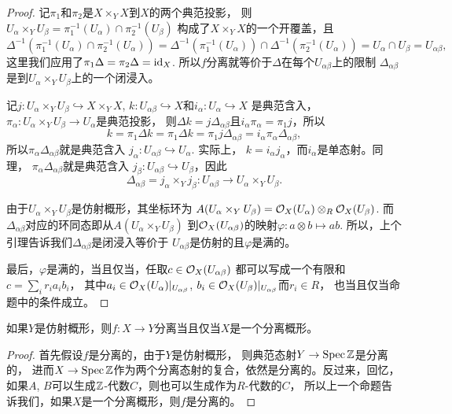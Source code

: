 \begin{proof}
记$\pi_1$和$\pi_2$是$X\times_Y X$到$X$的两个典范投影，
则$U_\alpha\times_Y U_\beta=\pi_1^{-1}(U_\alpha)\cap\pi_2^{-1}(U_\beta)$
构成了$X\times_Y X$的一个开覆盖，且
\[
	\Delta^{-1}\left(\pi_1^{-1}(U_\alpha)\cap\pi_2^{-1}(U_\alpha)\right)=
	\Delta^{-1}\left(\pi_1^{-1}(U_\alpha)\right)\cap\Delta^{-1}
	\left(\pi_2^{-1}(U_\alpha)\right)=U_\alpha\cap U_\beta=U_{\alpha\beta},
\]
这里我们应用了$\pi_1\Delta=\pi_2\Delta=\operatorname{id}_X$. 
所以$f$分离就等价于$\Delta$在每个$U_{\alpha\beta}$上的限制
$\Delta_{\alpha\beta}$是到$U_\alpha\times_Y U_\beta$上的一个闭浸入。

记$j:U_\alpha\times_Y U_\beta\hookrightarrow X \times_Y X$, 
$k:U_{\alpha\beta}\hookrightarrow X$和$i_\alpha:U_\alpha\hookrightarrow X$
是典范含入，$\pi_\alpha:U_\alpha\times_Y U_\beta\to U_\alpha$是典范投影，
则$\Delta k=j\Delta_{\alpha\beta}$且$i_\alpha\pi_\alpha=\pi_1j$，所以
\[
	k=\pi_1\Delta k=\pi_1\Delta k=\pi_1j\Delta_{\alpha\beta}=
	i_\alpha\pi_\alpha\Delta_{\alpha\beta},
\]
所以$\pi_\alpha\Delta_{\alpha\beta}$就是典范含入
$j_\alpha:U_{\alpha\beta}\hookrightarrow U_\alpha$. 实际上，
$k=i_\alpha j_\alpha$，而$i_\alpha$是单态射。同理，
$\pi_\alpha\Delta_{\alpha\beta}$就是典范含入
$j_\beta:U_{\alpha\beta}\hookrightarrow U_\beta$，因此
\[
	\Delta_{\alpha\beta}=j_\alpha\times_Y j_\beta:
	U_{\alpha\beta}\to U_\alpha\times_Y U_\beta.
\]

由于$U_\alpha\times_Y U_\beta$是仿射概形，其坐标环为
$A(U_\alpha\times_Y U_\beta)=\mathcal{O}_X(U_\alpha)\otimes_{R}\mathcal{O}_X(U_\beta)$.
而$\Delta_{\alpha\beta}$对应的环同态即从$A(U_\alpha\times_Y U_\beta)$
到$\mathcal{O}_X(U_{\alpha\beta})$的映射$\varphi:a\otimes b\mapsto ab$. 
所以，上个引理告诉我们$\Delta_{\alpha\beta}$是闭浸入等价于
$U_{\alpha\beta}$是仿射的且$\varphi$是满的。

最后，$\varphi$是满的，当且仅当，任取$c\in \mathcal{O}_X(U_{\alpha\beta})$
都可以写成一个有限和$c=\sum_{i}r_ia_ib_i$，
其中$a_i\in \mathcal{O}_X(U_\alpha)|_{U_{\alpha\beta}}$, 
$b_i\in \mathcal{O}_X(U_\beta)|_{U_{\alpha\beta}}$而$r_i\in R$，
也当且仅当命题中的条件成立。
\end{proof}

\begin{coro}
如果$Y$是仿射概形，则$f:X\to Y$分离当且仅当$X$是一个分离概形。
\end{coro}

\begin{proof}
首先假设$f$是分离的，由于$Y$是仿射概形，
则典范态射$Y\to \operatorname{Spec} \mathbb{Z}$是分离的，
进而$X\to\operatorname{Spec} \mathbb{Z}$作为两个分离态射的复合，依然是分离的。反过来，回忆，
如果$A$, $B$可以生成$\mathbb{Z}$-代数$C$，则也可以生成作为$R$-代数的$C$，
所以上一个命题告诉我们，如果$X$是一个分离概形，则$f$是分离的。
\end{proof}



